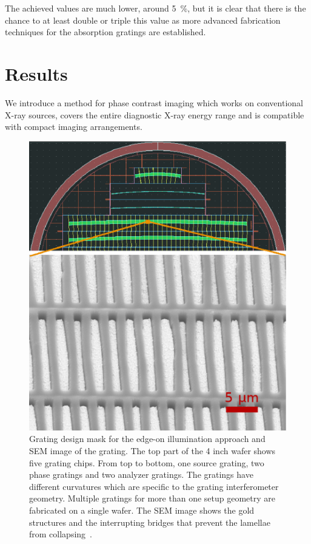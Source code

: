 The achieved values are much lower, around \SI{5}{\percent}, but it is clear
that there is the chance to at least double or triple this value as more
advanced fabrication techniques for the absorption gratings are established.

\section{Results}
We introduce a method for phase contrast imaging which works on
conventional X-ray sources, covers the entire diagnostic X-ray energy range
and is compatible with compact imaging arrangements. 

\begin{figure}[h!]
    \centering
    \includegraphics[width=\textwidth]{gfx/grating_mask.eps}
    \caption{Grating design mask for
        the edge-on illumination approach and \ac{SEM}
        image of the grating. The top part of the 4 inch wafer shows
        five grating chips. From top to bottom, one source grating, two
        phase gratings and two analyzer gratings. The
        gratings have different curvatures which are specific to the grating
        interferometer geometry. Multiple gratings for more than one setup
        geometry are fabricated on a single wafer.
        The \ac{SEM} image shows the gold structures and the interrupting bridges
        that prevent the lamellae from collapsing~\cite{Kenntner2010}.}\label{Fig:grating_mask}
\end{figure}

